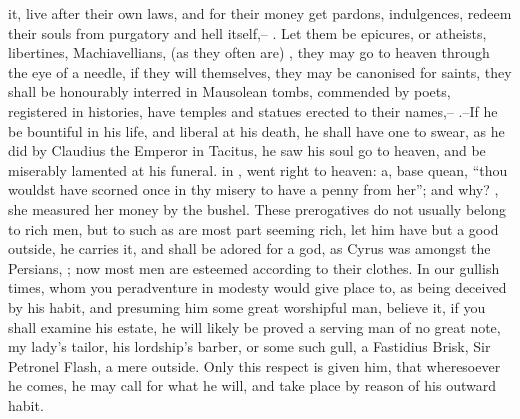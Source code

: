 it, live after their own laws, and for their money get pardons, indulgences,
redeem their souls from purgatory and hell itself,-- . Let them be epicures, or atheists, libertines, Machiavellians, (as they
often are) , they may go to heaven through the eye of a needle, if they will
themselves, they may be canonised for saints, they shall be
honourably interred in Mausolean tombs, commended by
poets, registered in histories, have temples and statues erected to their
names,-- .--If he be bountiful in his
life, and liberal at his death, he shall have one to swear, as he did by
Claudius the Emperor in Tacitus, he saw his soul go to heaven, and be miserably
lamented at his funeral. 
in \Petronius {}, went right to heaven: a, base quean,
\enquote{thou wouldst have scorned once in thy misery to have a
penny from her}; and why? , she measured her money by
the bushel. These prerogatives do not usually belong to rich men, but to such
as are most part seeming rich, let him have but a good
outside, he carries it, and shall be adored for a god, as
Cyrus was amongst the Persians, ; now most men are esteemed according to their
clothes. In our gullish times, whom you peradventure in modesty would give
place to, as being deceived by his habit, and presuming him some great
worshipful man, believe it, if you shall examine his estate, he will likely be
proved a serving man of no great note, my lady's tailor, his lordship's barber,
or some such gull, a Fastidius Brisk, Sir Petronel Flash, a mere outside. Only
this respect is given him, that wheresoever he comes, he may call for what he
will, and take place by reason of his outward habit.

